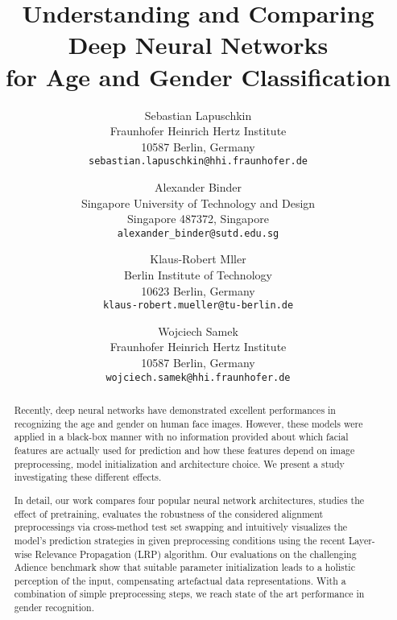 \documentclass[10pt,twocolumn,letterpaper]{article}
\begin{document}
\title{Understanding and Comparing Deep Neural Networks\\ for Age and Gender Classification}

\author{Sebastian Lapuschkin\\
Fraunhofer Heinrich Hertz Institute\\
10587 Berlin, Germany\\
{\tt\small sebastian.lapuschkin@hhi.fraunhofer.de}
\and
Alexander Binder\\
Singapore University of Technology and Design\\
Singapore 487372, Singapore\\
{\tt\small alexander\_binder@sutd.edu.sg}
\and
Klaus-Robert Mller\\
Berlin Institute of Technology\\
10623 Berlin, Germany\\
{\tt\small klaus-robert.mueller@tu-berlin.de}
\and
Wojciech Samek\\
Fraunhofer Heinrich Hertz Institute\\
10587 Berlin, Germany\\
{\tt\small wojciech.samek@hhi.fraunhofer.de}
}
\maketitle
\thispagestyle{empty}


\begin{abstract}
Recently, deep neural networks have demonstrated excellent performances in recognizing the age and gender on human face images.
However, these models were applied in a black-box manner with no information provided about which facial features are actually used for prediction
and how these features depend on image preprocessing, model initialization and architecture choice.
We present a study investigating these different effects.

In detail, our work compares four popular neural network architectures, studies the effect of pretraining, evaluates the robustness of the considered alignment preprocessings via cross-method test set swapping and intuitively visualizes the model's prediction strategies in given preprocessing conditions using the recent Layer-wise Relevance Propagation (LRP) algorithm.
Our evaluations on the challenging Adience benchmark show that suitable parameter initialization leads to a holistic perception of the input, compensating artefactual data representations. With a combination of simple preprocessing steps, we reach state of the art performance in gender recognition.



\end{abstract}
\end{document}
